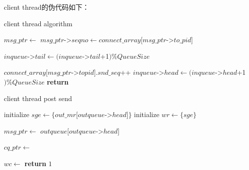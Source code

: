 {    client thread的伪代码如下：
    \begin{algorithm}
        \caption{client thread algorithm}
        \begin{algorithmic}[1] %
            \State {}
            \State $msg\_ptr \gets$ 
            \State $msg\_ptr$->$seqno \gets connect\_array[msg\_ptr$->$to\_pid]$

            \State
            \State {}
            \State {}
            \State {}
            \State $inqueue$->$tail \gets (inqueue$->$tail$+1$) \%QueueSize$
            \Else
            \EndWhile
            \EndIf

            \State
            \State $connect\_array[msg\_ptr$->$topid].snd\_seq$++
            \State $inqueue$->$head \gets (inqueue$->$head$+1$) \% QueueSize$
            \State {}
            \EndWhile
            \State \textbf{return}
            \EndProcedure
        \end{algorithmic}
    \end{algorithm}


    \begin{algorithm}
        \caption{client thread post send}
        \begin{algorithmic}[1] %
            \State initialize $sge \gets \{out\_mr[outqueue$->$head] \}$
            \State initialize $wr \gets \{sge\}$

            \State
            \State $msg\_ptr \gets$ $outqueue[outqueue$->$head]$

            \EndWhile

            \State
            \State $cq\_ptr \gets$ 
            \State {}

            \State
            \State $wc \gets$ 
            \State \textbf{return} $1$
            \EndIf


\end{algorithmic}
\end{algorithm}}
